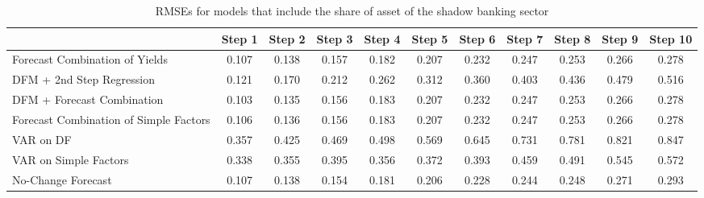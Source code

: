\documentclass[12pt]{article}
\begin{document}
\clearpage
\begin{sidewaystable}
\caption{RMSEs for models that include the share of asset of the shadow banking sector}
\center
\begin{tabular}{|l|c|c|c|c|c|c|c|c|c|c|}
\hline
&Step 1 &Step 2 &Step 3 &Step 4 &Step 5 &Step 6 &Step 7 &Step 8 &Step 9 &Step 10\\
\hline
Forecast Combination of Yields        &0.107&0.138&0.157&0.182&0.207&0.232&0.247&0.253&0.266&0.278\\
DFM + 2nd Step Regression             &0.121&0.170&0.212&0.262&0.312&0.360&0.403&0.436&0.479&0.516\\
DFM + Forecast Combination            &0.103&0.135&0.156&0.183&0.207&0.232&0.247&0.253&0.266&0.278\\
Forecast Combination of Simple Factors&0.106&0.136&0.156&0.183&0.207&0.232&0.247&0.253&0.266&0.278\\
VAR on DF                             &0.357&0.425&0.469&0.498&0.569&0.645&0.731&0.781&0.821&0.847\\
VAR on Simple Factors                 &0.338&0.355&0.395&0.356&0.372&0.393&0.459&0.491&0.545&0.572\\
No-Change Forecast                    &0.107&0.138&0.154&0.181&0.206&0.228&0.244&0.248&0.271&0.293\\
\hline
\end{tabular}
\end{sidewaystable}
\end{document}
